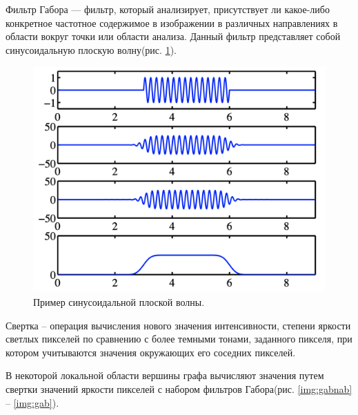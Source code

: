 Фильтр Габора --- фильтр, который анализирует, присутствует ли какое-либо конкретное частотное содержимое 
в изображении в различных направлениях в области вокруг точки или области анализа. Данный фильтр представляет собой 
синусоидальную плоскую волну(рис. \ref{img:sinuso}).\cite{gb}
\begin{figure}[h]
    \centering
    \includegraphics[width=0.35\textheight]{img/sin.png}
    \caption{Пример синусоидальной плоской волны.}
    \label{img:sinuso}
\end{figure}

\vspace{\baselineskip}
\vspace{\baselineskip}
\vspace{\baselineskip}
\vspace{\baselineskip}
\vspace{\baselineskip}
\vspace{\baselineskip}
\vspace{\baselineskip}

Свертка -- операция вычисления нового значения интенсивности, степени яркости
светлых пикселей по сравнению с более темными тонами,
заданного пикселя, при котором учитываются значения окружающих его соседних пикселей.

В некоторой локальной области вершины графа вычисляют значения
путем свертки значений яркости пикселей с набором фильтров Габора(рис. \ref{img:gabnab} -- \ref{img:gab}).

